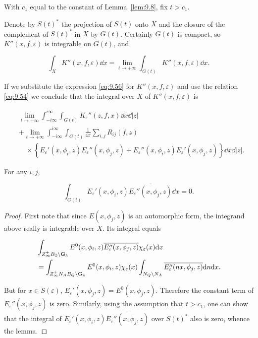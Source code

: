 With $c_1$ equal to the constant of Lemma~\ref{lem:9.8}, fix $t > c_1$.

Denote by $S(t)^{*}$ the projection of $S(t)$ onto $X$ and the closure of the complement of $S(t)^{*}$ in $X$ by $G(t)$. Certainly $G(t)$ is compact, so $K''(x, f, \varepsilon)$ is integrable on $G(t)$, and

\[
\int_X K''(x, f, \varepsilon)\dd x = \lim_{t \to +\infty}\int_{G(t)} K''(x, f, \varepsilon)\dd x.
\]

If we substitute the expression \eqref{eq:9.56} for $K''(x, f, \varepsilon)$ and use the relation \eqref{eq:9.54} we conclude that the integral over $X$ of $K''(x, f, \varepsilon)$ is

\[
\begin{aligned}
&\lim_{t \to +\infty}\int_{-i\infty}^{i\infty}\int_{G(t)} K_\varepsilon''(z, f, x)\dd x\dd|z|\\
&+ \lim_{t \to +\infty}\int_{-i\infty}^{i\infty}\int_{G(t)} \frac{1}{4\pi}\sum_{i, j} R_{ij}(f, z)\\
&\quad\times\left\{E_\varepsilon'(x, \phi_i, z)E_\varepsilon''(x, \phi_j, z) + E_\varepsilon''(x, \phi_i, z)E_\varepsilon'(x, \phi_j, z)\right\}\dd x\dd|z|.
\end{aligned}
\]

\begin{lemma}\label{lem:9.18}

For any $i, j$,

\[
\int_{G(t)} E_\varepsilon'(x, \phi_i, z)\overline{E_\varepsilon''(x, \phi_j, z)}\dd x = 0.
\]

\end{lemma}

\begin{proof}

First note that since $E(x, \phi_j, z)$ is an automorphic form, the integrand above really is integrable over $X$. Its integral equals

\[
\begin{aligned}
&\int_{Z_\infty^{+}B_{\mathbb{Q}} \backslash \mathbf{G}_{\mathbb{A}}} E^0(x, \phi_i, z)\overline{E_\varepsilon''(x, \phi_j, z)}\chi_\varepsilon(x)\mathrm{d} x\\
&= \int_{Z_\infty^{+}N_A B_Q \backslash \mathbf{G}_{\mathbb{A}}} E^0(x, \phi_i, z)\chi_\varepsilon(x)\int_{N_Q \backslash N_A}\overline{E_\varepsilon''(nx, \phi_j, z)}\mathrm{d} n\mathrm{d} x.
\end{aligned}
\]

But for $x \in S(\varepsilon)$, $E_\varepsilon'(x, \phi_j, z) = E^0(x, \phi_j, z)$. Therefore the constant term of $E_\varepsilon''(x, \phi_j, z)$ is zero. Similarly, using the assumption that $t > c_1$, one can show that the integral of $E_\varepsilon'(x, \phi_i, z)\overline{E_\varepsilon''(x, \phi_j, z)}$ over $S(t)^{*}$ also is zero, whence the lemma.

\end{proof}

